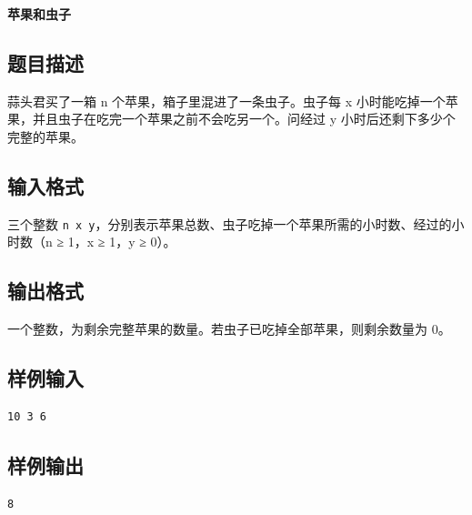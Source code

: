 \documentclass{article}
\newcommand{\problemname}[1]{\begin{center}\Large\bfseries #1\end{center}}
\begin{document}
\problemname{苹果和虫子}

\subsection*{题目描述}
蒜头君买了一箱 n 个苹果，箱子里混进了一条虫子。虫子每 x 小时能吃掉一个苹果，并且虫子在吃完一个苹果之前不会吃另一个。问经过 y 小时后还剩下多少个完整的苹果。

\subsection*{输入格式}
三个整数 \texttt{n x y}，分别表示苹果总数、虫子吃掉一个苹果所需的小时数、经过的小时数（n ≥ 1，x ≥ 1，y ≥ 0）。

\subsection*{输出格式}
一个整数，为剩余完整苹果的数量。若虫子已吃掉全部苹果，则剩余数量为 0。

\subsection*{样例输入}
\begin{verbatim}
10 3 6
\end{verbatim}

\subsection*{样例输出}
\begin{verbatim}
8
\end{verbatim}
\end{document}
